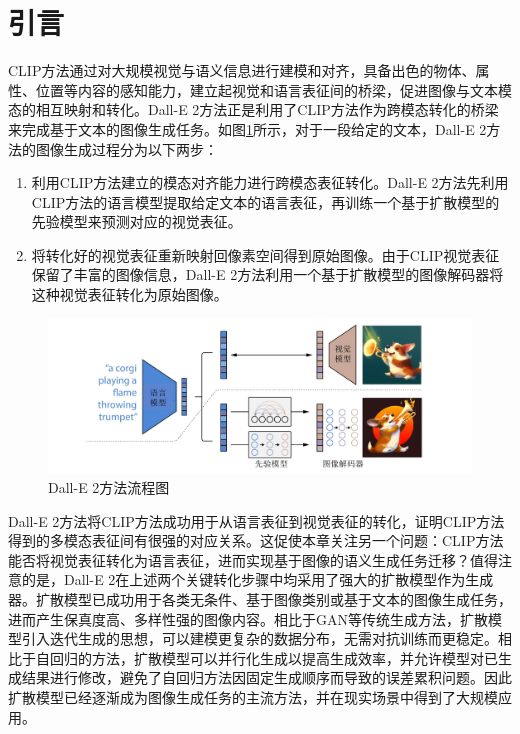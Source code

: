 \section{引言}
\label{sec:ddcap-intro}
CLIP方法通过对大规模视觉与语义信息进行建模和对齐，具备出色的物体、属性、位置等内容的感知能力，建立起视觉和语言表征间的桥梁，促进图像与文本模态的相互映射和转化。Dall-E 2方法\cite{dall-e2}正是利用了CLIP方法作为跨模态转化的桥梁来完成基于文本的图像生成任务。如图\ref{fig:ddcap-dalle2}所示，对于一段给定的文本，Dall-E 2方法的图像生成过程分为以下两步：
\begin{enumerate}
    \item 利用CLIP方法建立的模态对齐能力进行跨模态表征转化。Dall-E 2方法先利用CLIP方法的语言模型提取给定文本的语言表征，再训练一个基于扩散模型\cite{ddim,ddpm}的先验模型来预测对应的视觉表征。
    \item 将转化好的视觉表征重新映射回像素空间得到原始图像。由于CLIP视觉表征保留了丰富的图像信息，Dall-E 2方法利用一个基于扩散模型的图像解码器将这种视觉表征转化为原始图像。
\end{enumerate}

\begin{figure}
  \centering
  \includegraphics[width=1.0\linewidth]{figures/ddcap-dalle2-v3.pdf}
  \caption{Dall-E 2\cite{dall-e2}方法流程图}
  \label{fig:ddcap-dalle2}
\end{figure}

Dall-E 2方法将CLIP方法成功用于从语言表征到视觉表征的转化，证明CLIP方法得到的多模态表征间有很强的对应关系。这促使本章关注另一个问题：CLIP方法能否将视觉表征转化为语言表征，进而实现基于图像的语义生成任务迁移？值得注意的是，Dall-E 2在上述两个关键转化步骤中均采用了强大的扩散模型作为生成器。扩散模型\cite{ddpm, ddim}已成功用于各类无条件、基于图像类别或基于文本的图像生成任务\cite{beatsgan, glide, latentdiff, imagen}，进而产生保真度高、多样性强的图像内容。相比于GAN\cite{gan}等传统生成方法，扩散模型引入迭代生成的思想，可以建模更复杂的数据分布，无需对抗训练而更稳定。相比于自回归的方法，扩散模型可以并行化生成以提高生成效率，并允许模型对已生成结果进行修改，避免了自回归方法因固定生成顺序而导致的误差累积问题。因此扩散模型已经逐渐成为图像生成任务的主流方法，并在现实场景中得到了大规模应用\cite{latentdiff, dall-e2}。

